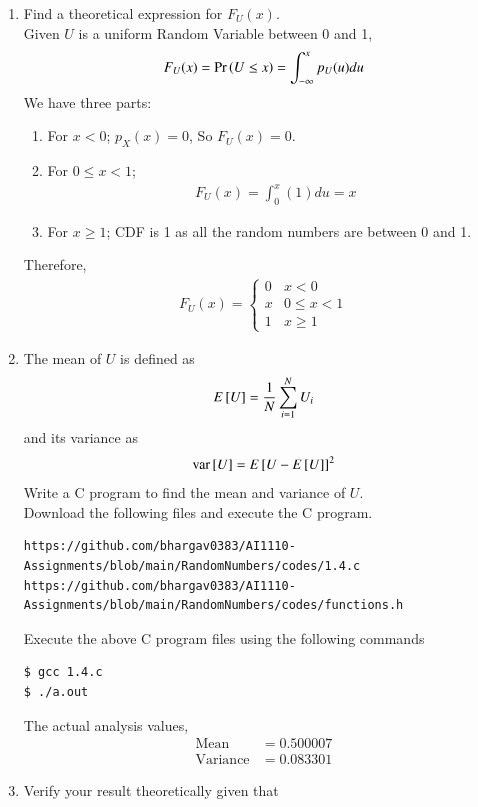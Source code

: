 \documentclass[journal,12pt,twocolumn]{IEEEtran}
\renewcommand\thesection{\arabic{section}}
\begin{document}
\begin{enumerate}[label=\thesection.\arabic*
,ref=\thesection.\theenumi]
\item
Find a  theoretical expression for $F_{U}(x)$.\\
\solution Given $U$ is a uniform Random Variable between 0 and 1,
\begin{align}
F_U(x) = \Pr\left(U \leq x\right) = \int_{-\infty}^{x}p_U(u)du
\end{align}
We have three parts:
		\begin{enumerate}[label=\roman*)]
			\item For $x < 0$; $p_X(x) = 0$, So $F_U(x) = 0$.
			\item For $0 \leq x < 1$;
				\begin{align}
					F_U(x) = \int_{0}^{x}(1)du = x
				\end{align}
			\item For $x \geq 1$; CDF is 1 as all the random numbers are between 0 and 1.
		\end{enumerate}
Therefore,
		\begin{align}
			F_U(x) = 
			\begin{cases}
				0 & x < 0 \\
				x & 0 \leq x < 1 \\
				1 & x \geq 1
			\end{cases}
		\end{align}
		
\item
The mean of $U$ is defined as
%
\begin{equation}
E{}\left[U\right] = \frac{1}{N}\sum_{i=1}^{N}U_i
\end{equation}
%
and its variance as
%
\begin{equation}
\text{var}{}\left[U\right] = E{}\left[U- E{}\left[U\right]\right]^2 
\end{equation}
Write a C program to  find the mean and variance of $U$. \\

\solution Download the following files and execute the  C program.
\begin{lstlisting}
https://github.com/bhargav0383/AI1110-Assignments/blob/main/RandomNumbers/codes/1.4.c
https://github.com/bhargav0383/AI1110-Assignments/blob/main/RandomNumbers/codes/functions.h
\end{lstlisting}
Execute the above C program files using the following commands
\begin{lstlisting}
$ gcc 1.4.c
$ ./a.out
\end{lstlisting}
The actual analysis values,
\begin{align}
    \text{Mean}&= 0.500007  \\
    \text{Variance} &=  0.083301
\end{align}
\item Verify your result theoretically given that
\end{enumerate}
\end{document}
